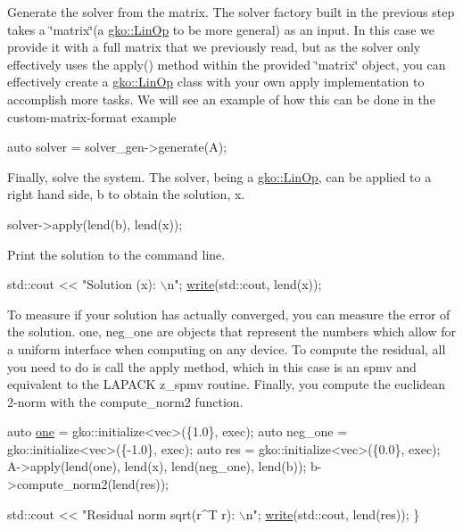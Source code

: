 Generate the solver from the matrix. The solver factory built in the previous step takes a \char`\"{}matrix\char`\"{}(a \hyperlink{classgko_1_1LinOp}{gko\+::\+Lin\+Op} to be more general) as an input. In this case we provide it with a full matrix that we previously read, but as the solver only effectively uses the apply() method within the provided \char`\"{}matrix\char`\"{} object, you can effectively create a \hyperlink{classgko_1_1LinOp}{gko\+::\+Lin\+Op} class with your own apply implementation to accomplish more tasks. We will see an example of how this can be done in the custom-\/matrix-\/format example


\begin{DoxyCode}
\textcolor{keyword}{auto} solver = solver\_gen->generate(A);
\end{DoxyCode}


Finally, solve the system. The solver, being a \hyperlink{classgko_1_1LinOp}{gko\+::\+Lin\+Op}, can be applied to a right hand side, b to obtain the solution, x.


\begin{DoxyCode}
solver->apply(lend(b), lend(x));
\end{DoxyCode}


Print the solution to the command line.


\begin{DoxyCode}
std::cout << \textcolor{stringliteral}{"Solution (x): \(\backslash\)n"};
\hyperlink{namespacegko_a859dc47a462721d83728d91ab7fa2148}{write}(std::cout, lend(x));
\end{DoxyCode}


To measure if your solution has actually converged, you can measure the error of the solution. one, neg\+\_\+one are objects that represent the numbers which allow for a uniform interface when computing on any device. To compute the residual, all you need to do is call the apply method, which in this case is an spmv and equivalent to the L\+A\+P\+A\+CK z\+\_\+spmv routine. Finally, you compute the euclidean 2-\/norm with the compute\+\_\+norm2 function.


\begin{DoxyCode}
    \textcolor{keyword}{auto} \hyperlink{namespacegko_a0059e27f8f4bc348ff65c1e60caf47c8}{one} = gko::initialize<vec>(\{1.0\}, exec);
    \textcolor{keyword}{auto} neg\_one = gko::initialize<vec>(\{-1.0\}, exec);
    \textcolor{keyword}{auto} res = gko::initialize<vec>(\{0.0\}, exec);
    A->apply(lend(one), lend(x), lend(neg\_one), lend(b));
    b->compute\_norm2(lend(res));

    std::cout << \textcolor{stringliteral}{"Residual norm sqrt(r^T r): \(\backslash\)n"};
    \hyperlink{namespacegko_a859dc47a462721d83728d91ab7fa2148}{write}(std::cout, lend(res));
\}
\end{DoxyCode}
 \label{_Results}%
